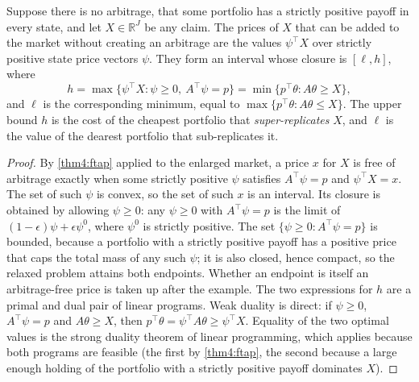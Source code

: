 \begin{chapterrefs}
\begin{proposition}\label{prop4:bounds}
Suppose there is no arbitrage, that some portfolio has a strictly positive payoff in every
state, and let $X\in\mathbb R^J$ be any claim. The prices of $X$ that can be added to the market
without creating an arbitrage are the values $\psi^\top X$ over strictly positive state price vectors
$\psi$. They form an interval whose closure is $[\ell,h]$, where
\begin{equation}\label{eq4:bounds}
  h=\max\{\psi^\top X:\psi\ge0,\ A^\top\psi=p\}=\min\{p^\top\theta:A\theta\ge X\},
\end{equation}
and $\ell$ is the corresponding minimum, equal to $\max\{p^\top\theta:A\theta\le X\}$. The upper
bound $h$ is the cost of the cheapest portfolio that \emph{super-replicates} $X$, and $\ell$ is the
value of the dearest portfolio that sub-replicates it.
\end{proposition}

\begin{proof}
By \cref{thm4:ftap} applied to the enlarged market, a price $x$ for $X$ is free of arbitrage exactly
when some strictly positive $\psi$ satisfies $A^\top\psi=p$ and $\psi^\top X=x$. The set of such
$\psi$ is convex, so the set of such $x$ is an interval. Its closure is obtained by allowing
$\psi\ge0$: any $\psi\ge0$ with $A^\top\psi=p$ is the limit of $(1-\epsilon)\psi+\epsilon\psi^0$,
where $\psi^0$ is strictly positive. The set $\{\psi\ge0:A^\top\psi=p\}$ is bounded, because a portfolio with a strictly positive
payoff has a positive price that caps the total mass of any such $\psi$; it is also closed, hence compact, so the relaxed problem attains both endpoints. Whether an endpoint
is itself an arbitrage-free price is taken up after the example. The two expressions for $h$ are a primal and dual pair
of linear programs. Weak duality is
direct: if $\psi\ge0$, $A^\top\psi=p$ and $A\theta\ge X$, then
$p^\top\theta=\psi^\top A\theta\ge\psi^\top X$. Equality of the two optimal values is the strong
duality theorem of linear programming, which applies because both programs are feasible (the first by
\cref{thm4:ftap}, the second because a large enough holding of the portfolio with a strictly positive
payoff dominates $X$).
\end{proof}


\end{chapterrefs}
